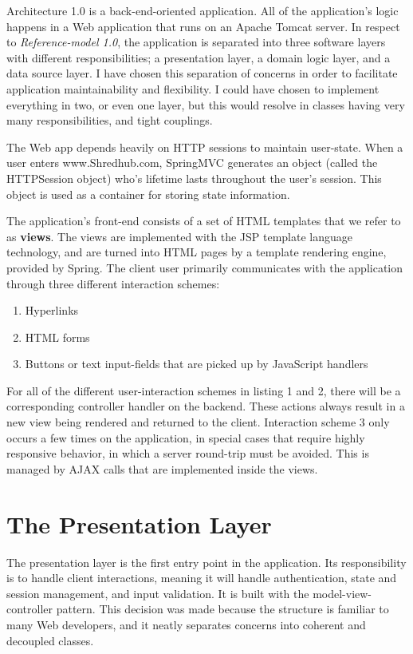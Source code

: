 Architecture 1.0 is a back-end-oriented application. All of the application's logic happens in a Web application that runs on an Apache Tomcat server. In respect to \textit{Reference-model 1.0}, the application is separated into three software layers with different responsibilities; a presentation layer, a domain logic layer, and a data source layer. I have chosen this separation of concerns in order to facilitate application maintainability and flexibility. I could have chosen to implement everything in two, or even one layer, but this would resolve in classes having very many responsibilities, and tight couplings. 

The Web app depends heavily on HTTP sessions to maintain user-state. When a user enters www.Shredhub.com, SpringMVC generates an object (called the HTTPSession object) who's lifetime lasts throughout the user's session. This object is used as a container for storing state information.

The application's front-end consists of a set of HTML templates that we refer to as \textbf{views}. The views are implemented with the JSP template language technology, and are turned into HTML pages by a template rendering engine, provided by Spring. The client user primarily communicates with the application through three different interaction schemes: 
\begin{enumerate}
\item {} Hyperlinks
\item{} HTML forms
\item{} Buttons or text input-fields that are picked up by JavaScript handlers
\end{enumerate}
For all of the different user-interaction schemes in listing 1 and 2, there will be a corresponding controller handler on the backend. These actions always result in a new view being rendered and returned to the client. Interaction scheme 3 only occurs a few times on the application, in special cases that require highly responsive behavior, in which a server round-trip must be avoided. This is managed by AJAX calls that are implemented inside the views. 

\section{The Presentation Layer}
The presentation layer is the first entry point in the application. Its responsibility is to handle client interactions, meaning it will handle authentication, state and session management, and input validation. It is built with the model-view-controller pattern. This decision  was made because the structure is familiar to many Web developers, and it neatly separates concerns into coherent and decoupled classes.  

